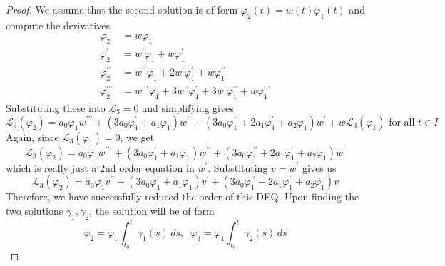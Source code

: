\documentclass{article}
\begin{document}
      \begin{proof}
      We assume that the second solution is of form $\varphi_2 (t) = w(t) \varphi_1(t)$ and compute the derivatives 
      \begin{align*}
          \varphi_2 & = w \varphi_1 \\
          \varphi_2^\prime & = w^\prime \varphi_1 + w \varphi_1^\prime \\
          \varphi_2^{\prime\prime} & = w^{\prime\prime} \varphi_1 + 2 w^\prime \varphi_1^\prime + w \varphi_1^{\prime\prime} \\
          \varphi_2^{\prime\prime\prime} & = w^{\prime\prime\prime} \varphi_1 + 3 w^{\prime\prime} \varphi_1^\prime + 3 w^\prime \varphi_1^{\prime\prime} + w \varphi_1^{\prime\prime\prime}
      \end{align*}
      Substituting these into $\mathcal{L}_3 = 0$ and simplifying gives
      \begin{equation}
        \mathcal{L}_3 (\varphi_2) = a_0 \varphi_1 w^{\prime\prime\prime} + (3a_0 \varphi_1^\prime + a_1\varphi_1) w^{\prime\prime} + (3 a_0 \varphi_1^{\prime\prime} + 2a_1 \varphi_1^\prime + a_2 \varphi_1) w^\prime + w \mathcal{L}_3 (\varphi_1) \text{ for all } t\in I
      \end{equation}
      Again, since $\mathcal{L}_3 (\varphi_1) = 0$, we get
      \begin{equation}
        \mathcal{L}_3 (\varphi_2) = a_0 \varphi_1 w^{\prime\prime\prime} + (3a_0 \varphi_1^\prime + a_1\varphi_1) w^{\prime\prime} + (3 a_0 \varphi_1^{\prime\prime} + 2a_1 \varphi_1^\prime + a_2 \varphi_1) w^\prime
      \end{equation}
      which is really just a 2nd order equation in $w^\prime$. Substituting $v = w^\prime$ gives us
      \begin{equation}
        \mathcal{L}_3 (\varphi_2) = a_0 \varphi_1 v^{\prime\prime} + (3a_0 \varphi_1^\prime + a_1 \varphi_1) v^\prime + (3 a_0 \varphi_1^{\prime\prime} + 2a_1 \varphi_1^\prime + a_2 \varphi_1) v
      \end{equation}
      Therefore, we have successfully reduced the order of this DEQ. Upon finding the two solutions $\gamma_1, \gamma_2$, the solution will be of form 
      \begin{equation}
        \varphi_2 = \varphi_1 \int_{t_0}^t \gamma_1(s)\,ds, \;\;\varphi_3 = \varphi_1 \int_{t_0}^t \gamma_2(s)\,ds
      \end{equation}
      \end{proof}
\end{document}
